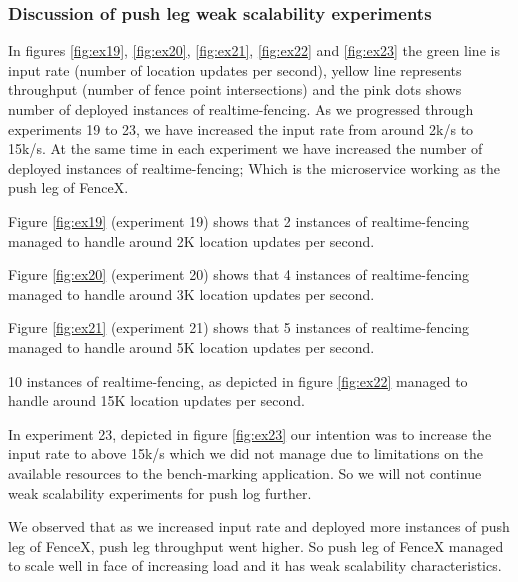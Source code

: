 \documentclass[a4]{report}
\begin{document}
    \clearpage

    \subsubsection{Discussion of push leg weak scalability experiments}
    In figures \ref{fig:ex19}, \ref{fig:ex20}, \ref{fig:ex21}, \ref{fig:ex22} and \ref{fig:ex23} the green line is
    input rate (number of location updates per second), yellow line represents throughput (number of fence point
    intersections) and the pink dots shows number of deployed instances of realtime-fencing.
    As we progressed through experiments 19 to 23, we have increased the input rate from around 2k/s to 15k/s.
    At the same time in each experiment we have increased the number of deployed instances of realtime-fencing;
    Which is the microservice working as the push leg of FenceX.

    Figure \ref{fig:ex19} (experiment 19) shows that 2 instances of realtime-fencing managed to handle around 2K
    location updates per second.

    Figure \ref{fig:ex20} (experiment 20) shows that 4 instances of realtime-fencing managed to handle around 3K
    location updates per second.

    Figure \ref{fig:ex21} (experiment 21) shows that 5 instances of realtime-fencing managed to handle around 5K
    location updates per second.

    10 instances of realtime-fencing, as depicted in figure \ref{fig:ex22} managed to handle around 15K location
    updates per second.

    In experiment 23, depicted in figure \ref{fig:ex23} our intention was to increase the input rate to above 15k/s which
    we did not manage due to limitations on the available resources to the bench-marking application.
    So we will not continue weak scalability experiments for push log further.

    We observed that as we increased input rate and deployed more instances of push leg of FenceX, push leg
    throughput went higher.
    So push leg of FenceX managed to scale well in face of increasing load and it has weak scalability characteristics.
\end{document}
